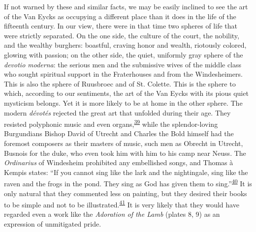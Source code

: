 If not warned by these and similar facts, we may be easily inclined to
see the art of the Van Eycks as occupying a different place than it does
in the life of the fifteenth century. In our view, there were in that
time two spheres of life that were strictly separated. On the one side,
the culture of the court, the nobility, and the wealthy burghers:
boastful, craving honor and wealth, riotously colored, glowing with
passion; on the other side, the quiet, uniformly gray sphere of the
\emph{devotio moderna}: the serious men and the submissive wives of the
middle class who sought spiritual support
\protect\hypertarget{20_ILLUSTRATIONS_FOLLOW_PAGE.xhtmlux5cux23page_314}{}{}in
the Fraterhouses and from the Windesheimers. This is also the sphere of
Ruusbroec and of St. Colette. This is the sphere to which, according to
our sentiments, the art of the Van Eycks with its pious quiet mysticism
belongs. Yet it is more likely to be at home in the other sphere. The
modern \emph{dévotés} rejected the great art that unfolded during their
age. They resisted polyphonic music and even
organs,\textsuperscript{\protect\hypertarget{20_ILLUSTRATIONS_FOLLOW_PAGE.xhtmlux5cux23id_395}{\protect\hyperlink{23_NOTES.xhtmlux5cux23id_396}{39}}}
while the splendor-loving Burgundians Bishop David of Utrecht and
Charles the Bold himself had the foremost composers as their masters of
music, such men as Obrecht in Utrecht, Busnois for the duke, who even
took him with him to his camp near Neuss. The \emph{Ordinarius} of
Windesheim prohibited any embellished songs, and Thomas à Kempis states:
``If you cannot sing like the lark and the nightingale, sing like the
raven and the frogs in the pond. They sing as God has given them to
sing.''\textsuperscript{\protect\hypertarget{20_ILLUSTRATIONS_FOLLOW_PAGE.xhtmlux5cux23id_393}{\protect\hyperlink{23_NOTES.xhtmlux5cux23id_394}{40}}}
It is only natural that they commented less on painting, but they
desired their books to be simple and not to be
illustrated.\textsuperscript{\protect\hypertarget{20_ILLUSTRATIONS_FOLLOW_PAGE.xhtmlux5cux23id_391}{\protect\hyperlink{23_NOTES.xhtmlux5cux23id_392}{41}}}
It is very likely that they would have regarded even a work like the
\emph{Adoration of the Lamb} (plates 8, 9) as an expression of
unmitigated pride.

